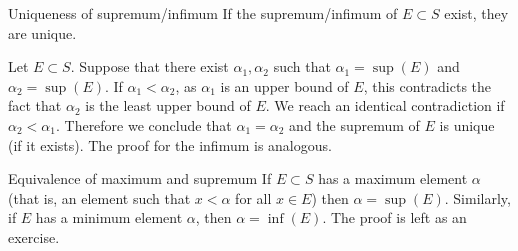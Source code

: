 \begin{ntheorem}{Uniqueness of supremum/infimum}
    If the supremum/infimum of $E \subset S$ exist, they are unique.
\end{ntheorem}
\begin{nproof}
        Let $E \subset S$. Suppose that there exist $\alpha_1, \alpha_2$ such that $\alpha_1 = \sup(E)$ and $\alpha_2 = \sup(E)$. If $\alpha_1 < \alpha_2$, as $\alpha_1$ is an upper bound of $E$, this contradicts the fact that $\alpha_2$ is the least upper bound of $E$. We reach an identical contradiction if $\alpha_2 < \alpha_1$. Therefore we conclude that $\alpha_1 = \alpha_2$ and the supremum of $E$ is unique (if it exists). The proof for the infimum is analogous. 
\end{nproof}

\begin{ntheorem}{Equivalence of maximum and supremum}
    If $E \subset S$ has a maximum element $\alpha$ (that is, an element such that $x < \alpha$ for all $x \in E$) then $\alpha = \sup(E)$. Similarly, if $E$ has a minimum element $\alpha$, then $\alpha = \inf(E)$. The proof is left as an exercise. 
\end{ntheorem}

\begin{comment}
\begin{nproof}
    Let $E \subset S$ and $\alpha = \max(E)$. By definition $\alpha$ is an upper bound of $E$, and if $x < \alpha$ for some $x \in E$ then $x$ is not an upper bound of $E$ as it is not greater than $\alpha \in E$. The claim follows (with an identical proof for the minimum).
\end{nproof}
\end{comment}


